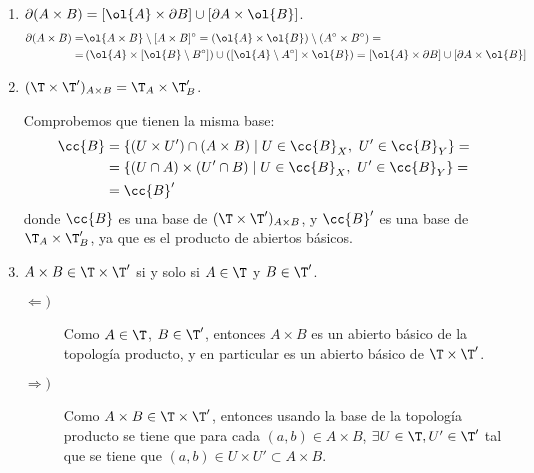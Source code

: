 \begin{ejercicio}
\begin{enumerate}
        
        \item $\partial{(A\times B)}=\left[\ol{A}\times \partial B\right]\cup \left[\partial A\times \ol{B}\right]$.
        \begin{equation*}
            \begin{split}
                \partial{(A\times B)} =& \ol{A\times B}\setminus [A\times B]^\circ = \left(\ol{A}\times \ol{B}\right)\setminus (A^\circ \times B^\circ) =\\=& \left(\ol{A}\times [\ol{B}\setminus B^\circ]\right)\cup \left([\ol{A}\setminus A^\circ]\times \ol{B}\right)
                = \left[\ol{A}\times \partial B\right]\cup \left[\partial A\times \ol{B}\right]
            \end{split}
        \end{equation*}
        
        \item $(\T \times \T')_{A\times B} = \T_A \times \T'_B$.

        Comprobemos que tienen la misma base:
        \begin{equation*}
            \begin{split}
                \cc{B}&= \{(U\times U')\cap (A\times B)\mid U\in \cc{B}_X,~U'\in \cc{B}_Y\} =\\
                &= \{(U\cap A)\times (U'\cap B)\mid U\in \cc{B}_X,~U'\in \cc{B}_Y\} =\\
                &= \cc{B}'
            \end{split}
        \end{equation*}
        donde $\cc{B}$ es una base de $(\T \times \T')_{A\times B}$, y $\cc{B}'$ es una base de $\T_A \times \T'_B$, ya que es el producto de abiertos básicos.
        
        \item $A \times B \in \T \times \T'$ si y solo si $A \in \T$ y $B \in \T'$.
        \begin{description}
            \item[$\Longleftarrow)$] Como $A\in \T$, $B\in \T'$, entonces $A\times B$ es un abierto básico de la topología producto, y en particular es un abierto básico de $\T\times \T'$.

            \item[$\Longrightarrow)$] Como $A\times B\in \T\times \T'$, entonces usando la base de la topología producto se tiene que para cada $(a,b)\in A\times B$, $\exists U\in \T,U'\in \T'$ tal que se tiene que $(a,b)\in U\times U'\subset A\times B$.


\end{description}
\end{enumerate}
\end{ejercicio}
